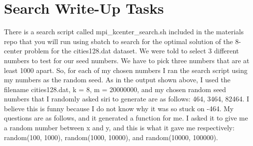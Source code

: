 \documentclass[12pt]{article}
\begin{document}

\section{Search Write-Up Tasks}

There is a search script called mpi\_kcenter\_search.sh included in the materials repo that you will run using sbatch to search for the optimal solution of the 8-center problem for the cities128.dat dataset. We were told to select 3 different numbers to test for our seed numbers. We have to pick three numbers that are at least 1000 apart. So, for each of my chosen numbers I ran the search script using my numbers as the random seed. As in the output shown above, I used the filename cities128.dat, k = 8, m = 20000000, and my chosen random seed numbers that I randomly asked siri to generate are as follows: 464, 3464, 82464.
I believe this is funny because I do not know why it was so stuck on -464. My questions are as follows, and it generated a function for me. I asked it to give me a random number between x and y, and this is what it gave me respectively: random(100, 1000), random(1000, 10000), and random(10000, 100000). 
\end{document}
